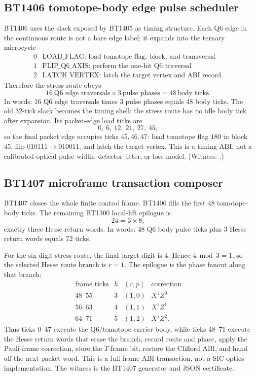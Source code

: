 \documentclass[11pt]{article}
\begin{document}
\subsection{BT1406 tomotope-body edge pulse scheduler}

BT1406 uses the slack exposed by BT1405 as timing structure.  Each Q6 edge in
the continuous route is not a bare edge label; it expands into the ternary
microcycle
\[
\begin{array}{c|l}
0 & \text{LOAD\_FLAG: load tomotope flag, block, and transversal}\\
1 & \text{FLIP\_Q6\_AXIS: perform the one-bit Q6 traversal}\\
2 & \text{LATCH\_VERTEX: latch the target vertex and ABI record.}
\end{array}
\]
Therefore the stress route obeys
\[
  16\ \text{Q6 edge traversals}\times 3\ \text{pulse phases}
  =48\ \text{body ticks}.
\]
In words: 16 Q6 edge traversals times 3 pulse phases equals 48 body ticks.
The old \(32\)-tick slack becomes the timing shell: the stress route has no idle
body tick after expansion.  Its packet-edge load ticks are
\[
  0,\ 6,\ 12,\ 21,\ 27,\ 45,
\]
so the final packet edge occupies ticks \(45,46,47\): load tomotope flag
\(180\) in block \(45\), flip \(010111\to010011\), and latch the target vertex.
This is a timing ABI, not a calibrated optical pulse-width, detector-jitter, or
loss model.  (Witness:
.)

\subsection{BT1407 microframe transaction composer}

BT1407 closes the whole finite control frame.  BT1406 fills the first \(48\)
tomotope-body ticks.  The remaining BT1300 local-lift epilogue is
\[
  24=3\times 8,
\]
exactly three Hesse return words.  In words: 48 Q6 body pulse ticks plus 3
Hesse return words equals 72 ticks.

For the six-digit stress route, the final target digit is \(4\).  Hence
\(4\bmod 3=1\), so the selected Hesse route branch is \(r=1\).  The epilogue is
the phase fanout along that branch:
\[
\begin{array}{c|c|c|c}
\text{frame ticks} & h & (r,p) & \text{correction}\\
\hline
48\text{--}55 & 3 & (1,0) & X^1Z^0\\
56\text{--}63 & 4 & (1,1) & X^1Z^1\\
64\text{--}71 & 5 & (1,2) & X^1Z^2.
\end{array}
\]
Thus ticks \(0\text{--}47\) execute the Q6/tomotope carrier body, while ticks
\(48\text{--}71\) execute the Hesse return words that erase the branch, record
route and phase, apply the Pauli-frame correction, store the \(T\)-frame bit,
restore the Clifford ABI, and hand off the next packet word.  This is a
full-frame ABI transaction, not a SIC-optics implementation.  The witness is
the BT1407 generator and JSON certificate.
\end{document}
